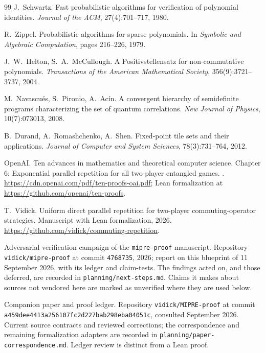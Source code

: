 \begin{thebibliography}{99}
J.~Schwartz.
\newblock Fast probabilistic algorithms for verification of polynomial identities.
\newblock \emph{Journal of the ACM}, 27(4):701--717, 1980.

R.~Zippel.
\newblock Probabilistic algorithms for sparse polynomials.
\newblock In \emph{Symbolic and Algebraic Computation}, pages 216--226, 1979.

J.~W.~Helton, S.~A.~McCullough.
\newblock A Positivstellensatz for non-commutative polynomials.
\newblock \emph{Transactions of the American Mathematical Society}, 356(9):3721--3737, 2004.

M.~Navascu\'es, S.~Pironio, A.~Ac\'in.
\newblock A convergent hierarchy of semidefinite programs characterizing the set of quantum correlations.
\newblock \emph{New Journal of Physics}, 10(7):073013, 2008.

B.~Durand, A.~Romashchenko, A.~Shen.
\newblock Fixed-point tile sets and their applications.
\newblock \emph{Journal of Computer and System Sciences}, 78(3):731--764, 2012.

OpenAI.
\newblock Ten advances in mathematics and theoretical computer science. Chapter 6:
Exponential parallel repetition for all two-player entangled games.
. \url{https://cdn.openai.com/pdf/ten-proofs-oai.pdf}; Lean
formalization at \url{https://github.com/openai/ten-proofs}.

T.~Vidick.
\newblock Uniform direct parallel repetition for two-player commuting-operator
strategies.
\newblock Manuscript with Lean formalization, 2026.
\url{https://github.com/vidick/commuting-repetition}.

Adversarial verification campaign of the \texttt{mipre-proof} manuscript.
\newblock Repository \texttt{vidick/mipre-proof} at commit \texttt{4768735}, 2026;
report on this blueprint of 11 September 2026, with its ledger and claim-tests.
\newblock The findings acted on, and those deferred, are recorded in
\texttt{planning/next-steps.md}. Claims it makes about sources not vendored here are
marked as unverified where they are used below.

Companion paper and proof ledger.
\newblock Repository \texttt{vidick/MIPRE-proof} at commit
\texttt{a459dee4413a256107fc2d227bab298eba04051c}, consulted September 2026.
\newblock Current source contracts and reviewed corrections; the correspondence and
remaining formalization adapters are recorded in
\texttt{planning/paper-correspondence.md}. Ledger review is distinct from a Lean proof.


\end{thebibliography}
